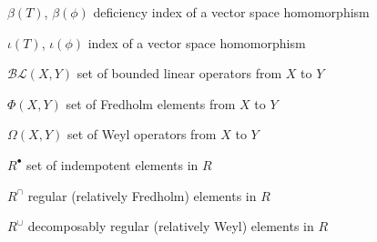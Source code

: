 \documentclass[12pt, oneside]{book}
\begin{document}
\begin{changemargin}{-2cm}{-2cm}
\medskip

$\beta(T)$, $\beta(\phi)$ \hfill deficiency index of a vector space homomorphism\

\medskip

$\iota(T)$, $\iota(\phi)$ \hfill index of a vector space homomorphism\

\medskip

$\mathcal{BL}(X,Y)$ \hfill set of bounded linear operators from $X$ to $Y$\

\medskip

$\Phi(X,Y)$ \hfill set of Fredholm elements from $X$ to $Y$\

\medskip

$\Omega(X,Y)$ \hfill set of Weyl operators from $X$ to $Y$\

\medskip

$R^{\bullet}$ \hfill set of indempotent elements in $R$\

\medskip

$R^{\cap}$ \hfill regular (relatively Fredholm) elements in $R$\

\medskip

$R^{\cup}$ \hfill decomposably regular (relatively Weyl) elements in $R$\

\medskip



\end{changemargin}
\end{document}
